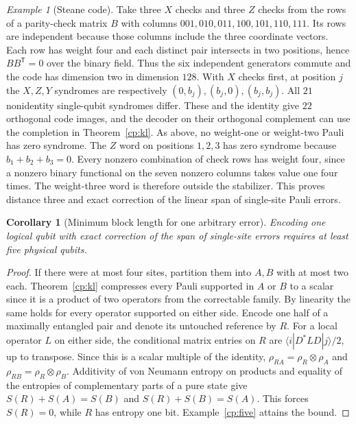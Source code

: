 \documentclass[aps,pra,onecolumn,superscriptaddress,nofootinbib,10pt]{revtex4-2}
\newtheorem{corollary}[theorem]{Corollary}
\theoremstyle{definition}
\theoremstyle{remark}
\newtheorem{example}[theorem]{Example}
\begin{document}
\begin{example}[Steane code]\label{cp:steane}
Take three $X$ checks and three $Z$ checks from the rows of a parity-check matrix $B$ with columns $001,010,011,100,101,110,111$. Its rows are independent because those columns include the three coordinate vectors. Each row has weight four and each distinct pair intersects in two positions, hence $BB^{\mathsf T}=0$ over the binary field. Thus the six independent generators commute and the code has dimension two in dimension $128$. With $X$ checks first, at position $j$ the $X,Z,Y$ syndromes are respectively $(0,b_j),(b_j,0),(b_j,b_j)$. All $21$ nonidentity single-qubit syndromes differ. These and the identity give $22$ orthogonal code images, and the decoder on their orthogonal complement can use the completion in Theorem~\ref{cp:kl}. As above, no weight-one or weight-two Pauli has zero syndrome. The $Z$ word on positions $1,2,3$ has zero syndrome because $b_1+b_2+b_3=0$. Every nonzero combination of check rows has weight four, since a nonzero binary functional on the seven nonzero columns takes value one four times. The weight-three word is therefore outside the stabilizer. This proves distance three and exact correction of the linear span of single-site Pauli errors. \cite{n5-steane-ref}
\end{example}

\begin{corollary}[Minimum block length for one arbitrary error]\label{cp:mincode}
Encoding one logical qubit with exact correction of the span of single-site errors requires at least five physical qubits.
\end{corollary}
\begin{proof}
If there were at most four sites, partition them into $A,B$ with at most two each. Theorem~\ref{cp:kl} compresses every Pauli supported in $A$ or $B$ to a scalar since it is a product of two operators from the correctable family. By linearity the same holds for every operator supported on either side. Encode one half of a maximally entangled pair and denote its untouched reference by $R$. For a local operator $L$ on either side, the conditional matrix entries on $R$ are $\langle i|D^*LD|j\rangle/2$, up to transpose. Since this is a scalar multiple of the identity, $\rho_{RA}=\rho_R\otimes\rho_A$ and $\rho_{RB}=\rho_R\otimes\rho_B$. Additivity of von Neumann entropy on products and equality of the entropies of complementary parts of a pure state give
$S(R)+S(A)=S(B)$ and $S(R)+S(B)=S(A)$. This forces $S(R)=0$, while $R$ has entropy one bit. Example~\ref{cp:five} attains the bound.
\end{proof}
\end{document}
